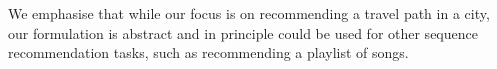 \begin{itemize}[noitemsep,leftmargin=12pt]
\end{itemize}

We emphasise that while
our focus is
on recommending a travel path in a city, our formulation is abstract and in principle could be
used for other sequence recommendation tasks, such as recommending a playlist of songs.




